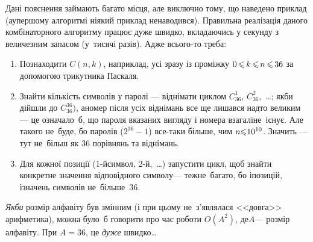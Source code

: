 Дані пояснення займають багато місця, але виключно тому, що наведено приклад (а\nolinebreak[3] у\nolinebreak[3] першому алгоритмі ніякий приклад не\nolinebreak[3] наводився). Правильна реалізація даного комбінаторного алгоритму працює дуже швидко, вкладаючись у секунду з величезним запасом (у~тисячі разів). Адже всього-то треба:

\begin{enumerate}

\item
Познаходити $C(n,k)$, наприклад, усі зразу із проміжку $0\dib{{\<}}k\dib{{\<}}n\dib{{\<}}36$ за допомогою трикутника Паскаля.

\item
Знайти кількість символів у паролі --- віднімати циклом $C_{36}^1$, $C_{36}^2$,~\dots; якби дійшли до $C_{36}^{36})$, а\nolinebreak[3] номер після усіх віднімань все ще лишався надто великим --- це означало~б, що пароля вказаних вигляду і номера взагалі\nolinebreak[2] не~існує. Але такого не~буде, бо паролів ($2^{36}-1$) все-таки більше, чим $n{\leqslant}10^{10}$. Значить --- тут %
не~більш як 36 порівнянь та віднімань.

\item
Для кожної позиції (1-й\nolinebreak[3] символ, 2-й,~\dots) запустити цикл, щоб знайти конкретне значення відповідного символу\nolinebreak[3] --- теж\nolinebreak[3] не~багато, бо і\nolinebreak[3] позицій, і\nolinebreak[3] значень символів не~більше~36.

\end{enumerate}


\emph{Якби} розмір алфавіту був змінним (і при цьому не~з'являлася <<довга>> арифметика), можна було~б говорити про час роботи $O(A^2)$, де\nolinebreak[3] $A$\nolinebreak[3] --- розмір алфавіту. При $A{=}36$, це \emph{дуже} швидко\dots
